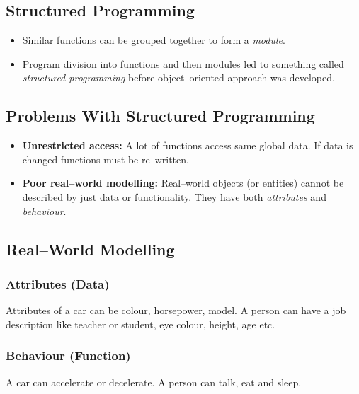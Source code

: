 \documentclass[12pt,a4paper]{article}
\begin{document}
\subsection{Structured Programming}
\begin{itemize}
\item Similar functions can be grouped together to form a \textit{module}.
\item Program division into functions and then modules led to something called \textit{structured programming} before object--oriented approach was developed.
\end{itemize}
\subsection{Problems With Structured Programming}
\begin{itemize}
\item \textbf{Unrestricted access:} A lot of functions access same global data. If data is changed functions must be re--written.
\item \textbf{Poor real--world modelling:} Real--world objects (or entities) cannot be described by just data or functionality. They have both \textit{attributes} and \textit{behaviour}.
\end{itemize}
\subsection{Real--World Modelling}
\subsubsection{Attributes (Data)}
Attributes of a car can be colour, horsepower, model. A person can have a job description like teacher or student, eye colour, height, age etc.
\subsubsection{Behaviour (Function)}
A car can accelerate or decelerate. A person can talk, eat and sleep.
\end{document}
